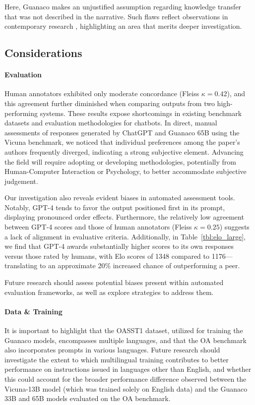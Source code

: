 Here, {Guanaco} makes an unjustified assumption regarding knowledge transfer that was not described in the narrative. Such flaws reflect observations in contemporary research \cite{sap2022neural}, highlighting an area that merits deeper investigation.

\subsection{Considerations}
\label{ssec:considerations}

\paragraph{Evaluation}

Human annotators exhibited only moderate concordance (Fleiss $\kappa=0.42$), and this agreement further diminished when comparing outputs from two high-performing systems. These results expose shortcomings in existing benchmark datasets and evaluation methodologies for chatbots. In direct, manual assessments of responses generated by ChatGPT and {Guanaco} 65B using the Vicuna benchmark, we noticed that individual preferences among the paper's authors frequently diverged, indicating a strong subjective element. Advancing the field will require adopting or developing methodologies, potentially from Human-Computer Interaction or Psychology, to better accommodate subjective judgement.

Our investigation also reveals evident biases in automated assessment tools. Notably, GPT-4 tends to favor the output positioned first in its prompt, displaying pronounced order effects. Furthermore, the relatively low agreement between GPT-4 scores and those of human annotators (Fleiss $\kappa=0.25$) suggests a lack of alignment in evaluative criteria. Additionally, in Table~\ref{tbl:elo_large}, we find that GPT-4 awards substantially higher scores to its own responses versus those rated by humans, with Elo scores of 1348 compared to 1176—translating to an approximate 20\% increased chance of outperforming a peer.

Future research should assess potential biases present within automated evaluation frameworks, as well as explore strategies to address them.

\paragraph{Data \& Training} It is important to highlight that the OASST1 dataset, utilized for training the {Guanaco} models, encompasses multiple languages, and that the OA benchmark also incorporates prompts in various languages. Future research should investigate the extent to which multilingual training contributes to better performance on instructions issued in languages other than English, and whether this could account for the broader performance difference observed between the Vicuna-13B model (which was trained solely on English data) and the {Guanaco} 33B and 65B models evaluated on the OA benchmark.

